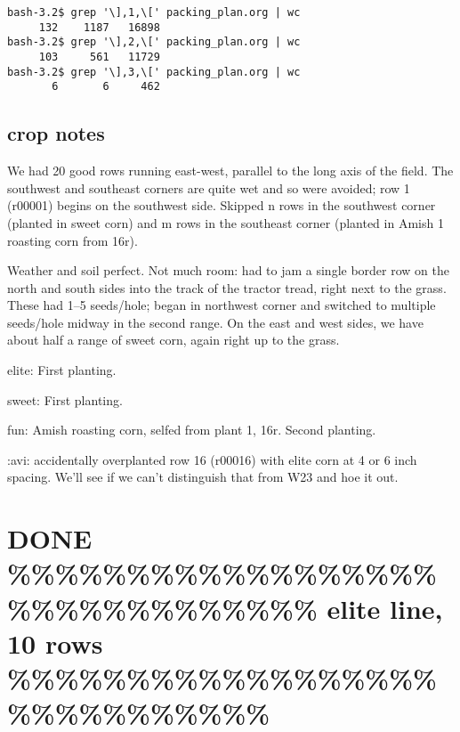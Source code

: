 \documentclass[11pt]{article}
\begin{document}
\begin{verbatim}
bash-3.2$ grep '\],1,\[' packing_plan.org | wc
     132    1187   16898
bash-3.2$ grep '\],2,\[' packing_plan.org | wc
     103     561   11729
bash-3.2$ grep '\],3,\[' packing_plan.org | wc
       6       6     462
\end{verbatim}


\subsection{crop notes}
\label{sec-1-7}

\begin{rmk}
We had 20 good rows running east-west, parallel to the long axis of the
field.  The southwest and southeast corners are quite wet and so were
avoided; row 1 (r00001) begins on the southwest side.  Skipped n rows in
the southwest corner (planted in sweet corn) and m rows in the southeast
corner (planted in Amish 1 roasting corn from 16r).
\end{rmk}


\begin{rmk}
Weather and soil perfect.  Not much room: had to jam a single border row on
the north and south sides into the track of the tractor tread, right next
to the grass.  These had 1--5 seeds/hole; began in northwest corner and
switched to multiple seeds/hole midway in the second range.  On the east
and west sides, we have about half a range of sweet corn, again right up to
the grass.
\end{rmk}




\begin{rmk}
elite:  First planting.

sweet:  First planting.

fun:  Amish roasting corn, selfed from plant 1, 16r.  Second planting.
\end{rmk}



\begin{rmk}
:avi: accidentally overplanted row 16 (r00016) with elite corn at 4 or 6
inch spacing.  We'll see if we can't distinguish that from W23 and hoe it
out. 
\end{rmk}


\section{{\bfseries\sffamily DONE} \%\%\%\%\%\%\%\%\%\%\%\%\%\%\%\%\%\%\%\%\%\%\%\%\%\%\%\%\%\%\% elite line, 10 rows \%\%\%\%\%\%\%\%\%\%\%\%\%\%\%\%\%\%\%\%\%\%\%\%\%\%\%\%\%}
\label{sec-2}
\end{document}

